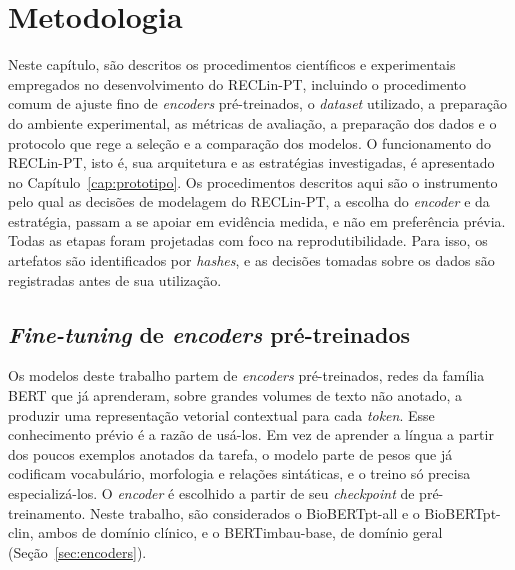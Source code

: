 \chapter[Metodologia]{Metodologia}
\label{cap:metodologia}

Neste capítulo, são descritos os procedimentos científicos e experimentais empregados no desenvolvimento do RECLin-PT, incluindo o procedimento comum de ajuste fino de \emph{encoders} pré-treinados, o \emph{dataset} utilizado, a preparação do ambiente
experimental, as métricas de avaliação, a preparação dos dados e o protocolo que
rege a seleção e a comparação dos modelos. O funcionamento do RECLin-PT, isto é, sua
arquitetura e as estratégias investigadas, é apresentado no
Capítulo~\ref{cap:prototipo}. Os procedimentos descritos aqui são o instrumento pelo
qual as decisões de modelagem do RECLin-PT, a escolha do \emph{encoder} e da
estratégia, passam a se apoiar em evidência medida, e não em preferência prévia.
Todas as etapas foram projetadas com foco na reprodutibilidade. Para isso, os artefatos são identificados por \emph{hashes}, e as decisões tomadas sobre os dados são registradas antes de sua utilização.

\section{\emph{Fine-tuning} de \emph{encoders} pré-treinados}
\label{sec:finetuning}

Os modelos deste trabalho partem de \emph{encoders} pré-treinados, redes da família BERT \cite{devlin_2019_bert} que já aprenderam, sobre grandes volumes de texto
não anotado, a produzir uma representação vetorial contextual para cada
\emph{token}. Esse conhecimento prévio é a razão de usá-los. Em vez de aprender a
língua a partir dos poucos exemplos anotados da tarefa, o modelo parte de pesos que
já codificam vocabulário, morfologia e relações sintáticas, e o treino só precisa
especializá-los. O \emph{encoder} é escolhido a partir de seu \emph{checkpoint} de pré-treinamento. Neste trabalho, são considerados o BioBERTpt-all e o BioBERTpt-clin, ambos de domínio clínico, e o BERTimbau-base, de domínio geral (Seção~\ref{sec:encoders}).

